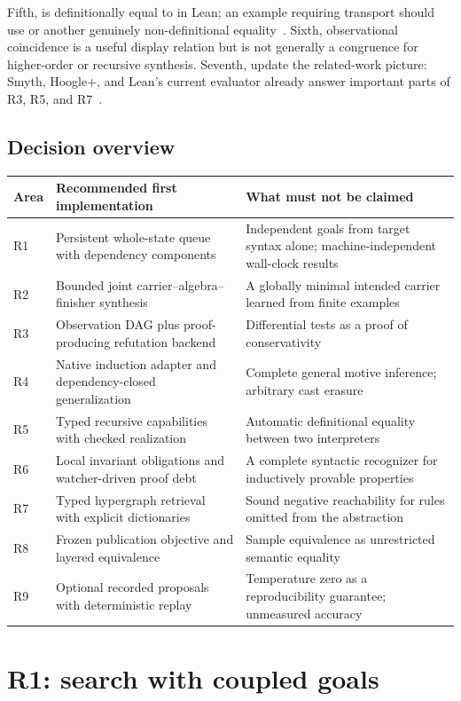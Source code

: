 \documentclass[11pt,a4paper]{article}
\theoremstyle{definition}
\theoremstyle{remark}
\newcommand{\code}[1]{\texttt{\detokenize{#1}}}
\begin{document}
Fifth, \code{n + 0} is definitionally equal to \code{n} in Lean; an example
requiring transport should use \code{0 + n} or another genuinely
non-definitional equality~\cite{lean-recursion}. Sixth, observational
coincidence is a useful display relation but is not generally a congruence for
higher-order or recursive synthesis. Seventh, update the related-work picture:
Smyth, Hoogle+, and Lean's current evaluator already answer important parts of
R3, R5, and R7~\cite{smyth,hoogle,lean-cbv}.

\subsection{Decision overview}
\begin{longtable}{@{}L{9mm}L{53mm}L{89mm}@{}}
\toprule
Area & Recommended first implementation & What must not be claimed\\
\midrule\endhead
R1 & Persistent whole-state queue with dependency components & Independent goals from target syntax alone; machine-independent wall-clock results\\
R2 & Bounded joint carrier--algebra--finisher synthesis & A globally minimal intended carrier learned from finite examples\\
R3 & Observation DAG plus proof-producing refutation backend & Differential tests as a proof of conservativity\\
R4 & Native induction adapter and dependency-closed generalization & Complete general motive inference; arbitrary cast erasure\\
R5 & Typed recursive capabilities with checked realization & Automatic definitional equality between two interpreters\\
R6 & Local invariant obligations and watcher-driven proof debt & A complete syntactic recognizer for inductively provable properties\\
R7 & Typed hypergraph retrieval with explicit dictionaries & Sound negative reachability for rules omitted from the abstraction\\
R8 & Frozen publication objective and layered equivalence & Sample equivalence as unrestricted semantic equality\\
R9 & Optional recorded proposals with deterministic replay & Temperature zero as a reproducibility guarantee; unmeasured accuracy\\
\bottomrule
\end{longtable}

\section{R1: search with coupled goals}\label{sec:r1}
\end{document}
